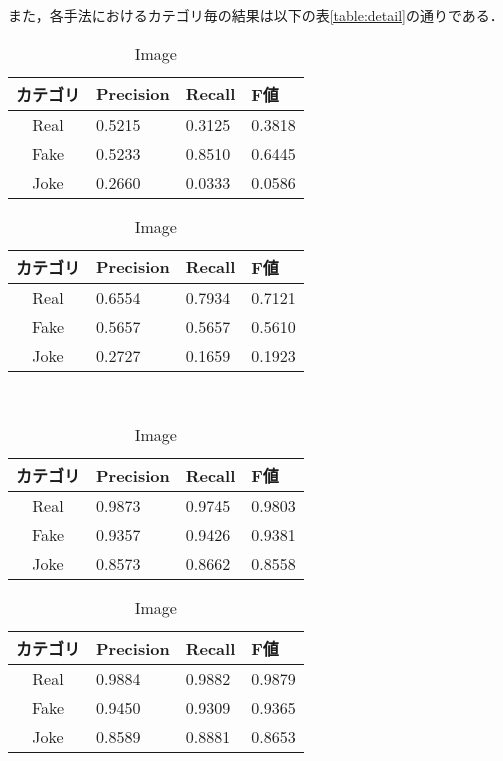また，各手法におけるカテゴリ毎の結果は以下の表\ref{table:detail}の通りである．
\begin{table}[ht]
    \caption{各手法におけるカテゴリ毎の分類成果}
    \label{table:detail}
    \begin{subtable}{.48\textwidth}
        \centering
        \label{table:text}
        \caption{Text}
        \begin{tabular}{clll}
            \hline
            カテゴリ & Precision & Recall & F値 \\
            \hline \hline
            Real & 0.5215 & 0.3125 & 0.3818 \\
            Fake & 0.5233 & 0.8510 & 0.6445 \\
            Joke & 0.2660 & 0.0333 & 0.0586 \\
            \hline
        \end{tabular}
    \end{subtable}
    \hfil
    \begin{subtable}{.48\textwidth}
        \centering
        \label{table:image}
        \caption{Image}
        \begin{tabular}{clll}
            \hline
            カテゴリ & Precision & Recall & F値 \\
            \hline \hline
            Real & 0.6554 & 0.7934 & 0.7121 \\
            Fake & 0.5657 & 0.5657 & 0.5610 \\
            Joke & 0.2727 & 0.1659 & 0.1923 \\
            \hline
        \end{tabular}
    \end{subtable}
    \\
    \begin{subtable}{.48\textwidth}
        \centering
        \label{table:proposedA}
        \caption{Image}
        \begin{tabular}{clll}
            \hline
            カテゴリ & Precision & Recall & F値 \\
            \hline \hline
            Real & 0.9873 & 0.9745 & 0.9803 \\
            Fake & 0.9357 & 0.9426 & 0.9381 \\
            Joke & 0.8573 & 0.8662 & 0.8558 \\
            \hline
        \end{tabular}
    \end{subtable}
    \hfil
    \begin{subtable}{.48\textwidth}
        \centering
        \label{table:proposedB}
        \caption{Image}
        \begin{tabular}{clll}
            \hline
            カテゴリ & Precision & Recall & F値 \\
            \hline \hline
            Real & 0.9884 & 0.9882 & 0.9879 \\
            Fake & 0.9450 & 0.9309 & 0.9365 \\
            Joke & 0.8589 & 0.8881 & 0.8653 \\
            \hline
        \end{tabular}
    \end{subtable}
\end{table}